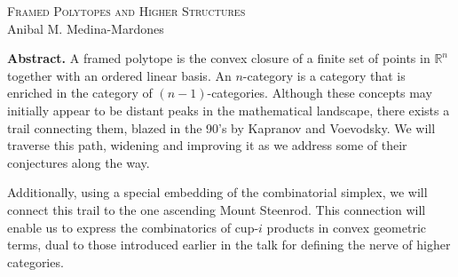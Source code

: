 \documentclass{article}
\begin{document}
	\pagestyle{empty}
	\begin{center}
		\vspace*{5pt}
		\Large\textsc{Framed Polytopes and Higher Structures} \\
		\vspace*{10pt}
		\normalsize Anibal M. Medina-Mardones \\
	\end{center}
	\textbf{Abstract.}
	A framed polytope is the convex closure of a finite set of points in $\mathbb{R}^n$ together with an ordered linear basis.
	An $n$-category is a category that is enriched in the category of $(n-1)$-categories. Although these concepts may initially appear to be distant peaks in the mathematical landscape, there exists a trail connecting them, blazed in the 90's by Kapranov and Voevodsky. We will traverse this path, widening and improving it as we address some of their conjectures along the way.
	
	Additionally, using a special embedding of the combinatorial simplex, we will connect this trail to the one ascending Mount Steenrod. This connection will enable us to express the combinatorics of cup-$i$ products in convex geometric terms, dual to those introduced earlier in the talk for defining the nerve of higher categories.
\end{document}
